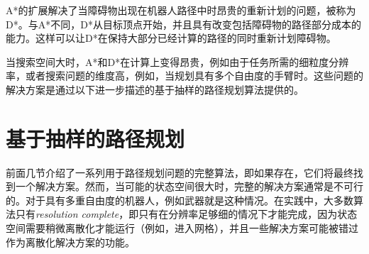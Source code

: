 A*的扩展解决了当障碍物出现在机器人路径中时昂贵的重新计划的问题，被称为D*\cite{stentz1994optimal}。与A*不同，D*从目标顶点开始，并且具有改变包括障碍物的路径部分成本的能力。这样可以让D*在保持大部分已经计算的路径的同时重新计划障碍物。

当搜索空间大时，A*和D*在计算上变得昂贵，例如由于任务所需的细粒度分辨率，或者搜索问题的维度高，例如，当规划具有多个自由度的手臂时。这些问题的解决方案是通过以下进一步描述的基于抽样的路径规划算法提供的。

\section{基于抽样的路径规划}



前面几节介绍了一系列用于路径规划问题的完整算法，即如果存在，它们将最终找到一个解决方案。然而，当可能的状态空间很大时，完整的解决方案通常是不可行的。对于具有多重自由度的机器人，例如武器就是这种情况。在实践中，大多数算法只有\emph{resolution complete}，即只有在分辨率足够细的情况下才能完成，因为状态空间需要稍微离散化才能运行（例如，进入网格），并且一些解决方案可能被错过作为离散化解决方案的功能。

